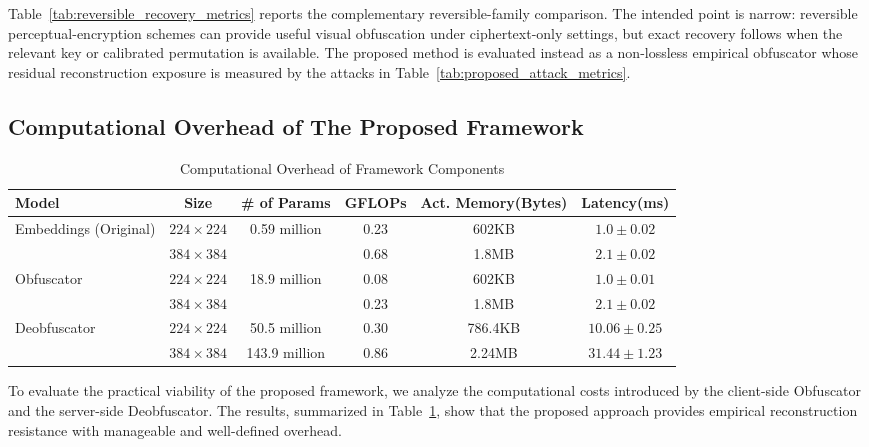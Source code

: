 \documentclass{ieeeaccess}
\newcommand{\rev}[1]{{\color{black}#1}}
\begin{document}
\rev{Table~\ref{tab:reversible_recovery_metrics} reports the complementary reversible-family comparison. The intended point is narrow: reversible perceptual-encryption schemes can provide useful visual obfuscation under ciphertext-only settings, but exact recovery follows when the relevant key or calibrated permutation is available. The proposed method is evaluated instead as a non-lossless empirical obfuscator whose residual reconstruction exposure is measured by the attacks in Table~\ref{tab:proposed_attack_metrics}.}


\subsection{Computational Overhead of The Proposed Framework}

\begin{table}[t!]
\centering
\caption{Computational Overhead of Framework Components}
\label{tab:overheads}
\begin{tabular}{l c c c c c}
\toprule
\textbf{Model} & \textbf{Size} & \textbf{\# of Params} & \textbf{GFLOPs} & \textbf{Act. Memory}(Bytes) & \textbf{Latency}(ms) \\
\midrule
\multirow{2}{*}{Embeddings (Original)}      & $224\times224$           &  \multirow{2}{*}{0.59 million}  & 0.23 & 602KB  & $1.0 \pm 0.02$  \\
     & $384\times384$           &    & 0.68 &  1.8MB  & $2.1 \pm 0.02$  \\
\midrule
\multirow{2}{*}{Obfuscator}      & $224\times224$           &  \multirow{2}{*}{18.9 million}  & 0.08 & 602KB  & $1.0 \pm 0.01$  \\
     & $384\times384$           &    & 0.23 &  1.8MB  & $2.1 \pm 0.02$  \\
\midrule
\multirow{2}{*}{Deobfuscator}      & $224\times224$           &  50.5 million  & 0.30 & 786.4KB  & $10.06 \pm 0.25$  \\
     & $384\times384$           &  143.9 million  & 0.86 &  2.24MB  &  $31.44 \pm 1.23$ \\

\bottomrule
\end{tabular}
\end{table}

\rev{To evaluate the practical viability of the proposed framework, we analyze the computational costs introduced by the client-side Obfuscator and the server-side Deobfuscator. The results, summarized in Table~\ref{tab:overheads}, show that the proposed approach provides empirical reconstruction resistance with manageable and well-defined overhead.}
\end{document}

